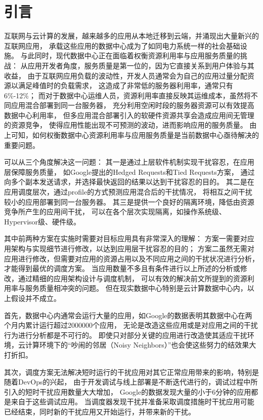 

\chapter{引言}
\label{chap:intro}

互联网与云计算的发展，越来越多的应用从本地迁移到云端，并涌现出大量新兴的互联网应用，
承载这些应用的数据中心成为了如同电力系统一样的社会基础设施。
与此同时，现代数据中心正在面临着权衡资源利用率与应用服务质量的挑战：
从应用开发者角度，服务质量是第一位的，因为它直接关系到用户体验与其收益，
由于互联网应用负载的波动性，开发人员通常会为自己的应用过量分配资源以满足峰值时的负载需求，
这造成了非常低的服务器利用率，通常只有6\%-12\%；
而对于数据中心运维人员，资源利用率直接反映其运维成本，虽然将不同应用混合部署到同一台服务器，
充分利用空闲时段的服务器资源可以有效提高数据中心利用率，
但多应用混合部署引入的软硬件资源共享会造成应用间无管理的资源竞争，
使得应用性能出现不可预测的波动，进而影响应用的服务质量。
由上可知，如何权衡数据中心资源利用率与应用服务质量是当前数据中心亟待解决的重要问题。

可以从三个角度解决这一问题：
其一是通过上层软件机制实现干扰容忍，在应用层保障服务质量，
如Google提出的Hedged Requests和Tied Requests方案\cite{dean_tail_2013}，
通过向多个副本发送请求，并选择最快返回的结果以达到干扰容忍的目的。%
其二是在应用调度层次，通过profile的方式预测应用混合后的干扰情况，
将相互之间干扰较小的应用部署到同一台服务器。
其三是提供一个良好的隔离环境，降低由资源竞争所产生的应用间干扰，
可以在各个层次实现隔离，如操作系统级\cite{cgroup}、Hypervisor级\cite{}、硬件级\cite{}。

其中前两种方案在实施时需要对目标应用具有非常深入的理解：
方案一需要对应用架构与实现细节进行修改，以达到应用层干扰容忍的目的；
方案二虽然无需对应用进行修改，但需要对应用的资源占用以及不同应用之间的干扰状况进行分析，
才能得到最优的调度方案。
当应用数量不多且有条件进行以上所述的分析或修改，通过精细的应用架构设计与调度机制，
可以有效的解决前文所提到的资源利用率与服务质量相冲突的问题。
但在现实数据中心特别是云计算数据中心内，以上假设并不成立。

首先，数据中心内通常会运行大量的应用，如Google的数据\cite{}表明其数据中心在两个月内累计运行超过2000000个应用，
无论是改造这些应用或是对应用之间的干扰行为进行分析都是不可行的。
即使只对部分关键的应用进行改造使其适应干扰环境，云计算环境下的“吵闹的邻居（Noisy Neighbors）”也会使这些努力的结效果大打折扣。

其次，调度方案无法解决短时运行的干扰应用对其它正常应用带来的影响，特别是随着DevOps的兴起，
由于开发调试与线上部署是不断迭代进行的，调试过程中所引入的短时干扰应用数量大大增加，
Google的数据\cite{}发现大量的小于6分钟的应用都是来自于这些调试应用。
当调度器发现干扰并准备采取调度措施时干扰应用可能已经结束，同时新的干扰应用又开始运行，并带来新的干扰。

